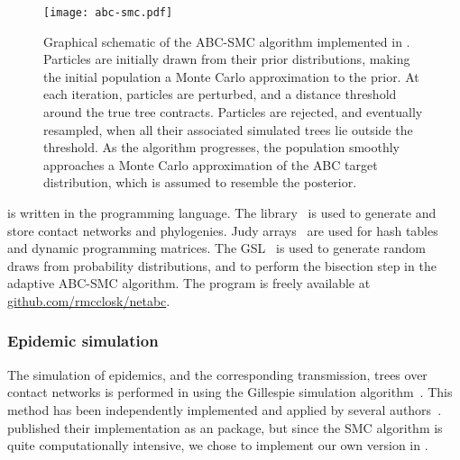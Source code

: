 \begin{figure}
    \texttt{[image: abc-smc.pdf]}
    \caption[Graphical schematic of \gls{ABC}-\gls{SMC} algorithm.]{
      Graphical schematic of the \gls{ABC}-\gls{SMC} algorithm implemented in
      . Particles are initially drawn from their prior
      distributions, making the initial population a Monte Carlo approximation
      to the prior. At each iteration, particles are perturbed, and a distance
      threshold around the true tree contracts. Particles are rejected, and
      eventually resampled, when all their associated simulated trees lie
      outside the threshold. As the algorithm progresses, the population
      smoothly approaches a Monte Carlo approximation of the \gls{ABC} target
      distribution, which is assumed to resemble the posterior.
    }
    \label{fig:abcsmc}
\end{figure}

 is written in the  programming language. The
 library~\autocite{csardi2006igraph} is used to generate and
store contact networks and phylogenies. Judy arrays~\autocite{baskins2004judy}
are used for hash tables and dynamic programming matrices. The
\gls{GSL}~\autocite{gough2009gnu} is used to generate random draws from
probability distributions, and to perform the bisection step in the adaptive
\gls{ABC}-\gls{SMC} algorithm. The program is freely available at
\url{github.com/rmcclosk/netabc}.

\subsubsection*{Epidemic simulation}
\label{subsubsec:nettree}

The simulation of epidemics, and the corresponding transmission, trees over
contact networks is performed in  using the Gillespie
simulation algorithm~\autocite{gillespie1976general}. This method has been
independently implemented and applied by several
authors~\autocite[\textit{e.g.}][]{o2010contact, robinson2013dynamics,
leventhal2012inferring, groendyke2011bayesian}.
\textcite{groendyke2011bayesian} published their implementation as an
 package, but since the \gls{SMC} algorithm is quite
computationally intensive, we chose to implement our own version in
.

